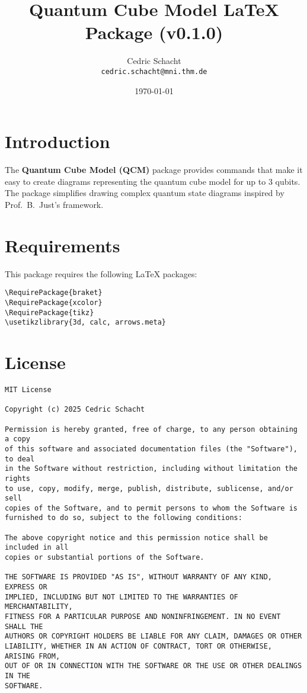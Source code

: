 \documentclass{article}
\title{Quantum Cube Model LaTeX Package (v0.1.0)}
\author{Cedric Schacht \\ \texttt{cedric.schacht@mni.thm.de}}
\date{\today}
\begin{document}
\maketitle

\section*{Introduction}

The \textbf{Quantum Cube Model (QCM)} package provides commands that make it easy to create diagrams representing the quantum cube model for up to 3 qubits.
The package simplifies drawing complex quantum state diagrams inspired by Prof.~B.~Just's framework.

\section*{Requirements}

This package requires the following LaTeX packages:

\begin{verbatim}
\RequirePackage{braket}
\RequirePackage{xcolor}
\RequirePackage{tikz}
\usetikzlibrary{3d, calc, arrows.meta}
\end{verbatim}

\section*{License}
\begin{verbatim}
MIT License

Copyright (c) 2025 Cedric Schacht

Permission is hereby granted, free of charge, to any person obtaining a copy
of this software and associated documentation files (the "Software"), to deal
in the Software without restriction, including without limitation the rights
to use, copy, modify, merge, publish, distribute, sublicense, and/or sell
copies of the Software, and to permit persons to whom the Software is
furnished to do so, subject to the following conditions:

The above copyright notice and this permission notice shall be included in all
copies or substantial portions of the Software.

THE SOFTWARE IS PROVIDED "AS IS", WITHOUT WARRANTY OF ANY KIND, EXPRESS OR
IMPLIED, INCLUDING BUT NOT LIMITED TO THE WARRANTIES OF MERCHANTABILITY,
FITNESS FOR A PARTICULAR PURPOSE AND NONINFRINGEMENT. IN NO EVENT SHALL THE
AUTHORS OR COPYRIGHT HOLDERS BE LIABLE FOR ANY CLAIM, DAMAGES OR OTHER
LIABILITY, WHETHER IN AN ACTION OF CONTRACT, TORT OR OTHERWISE, ARISING FROM,
OUT OF OR IN CONNECTION WITH THE SOFTWARE OR THE USE OR OTHER DEALINGS IN THE
SOFTWARE.
\end{verbatim}
\end{document}
